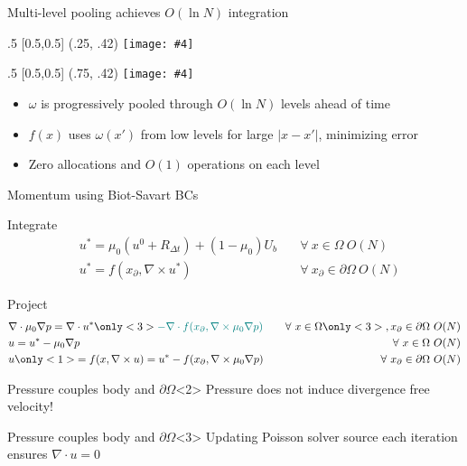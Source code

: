 \documentclass[aspectratio=169,small]{beamer}
\newcommand{\absimage}[4][0.5,0.5]{%
	\begin{textblock}{#3}%
		[#1]%
		(#2)%
		\texttt{[image: \#4]}%
\end{textblock}}
\begin{document}
\begin{frame}[fragile]{Multi-level pooling achieves $O(\ln N)$ integration} %
    \absimage{.25, .42}{.5}{fig/full_vort.png}
    \absimage{.75, .42}{.5}{fig/multilevel_vort.png}
    \vspace{52mm}
    \begin{itemize}
        \item $\omega$ is progressively pooled through $O(\ln N)$ levels ahead of time
        \item $f(x)$ uses $\omega(x')$ from low levels for large $|x-x'|$, minimizing error
        \item Zero allocations and $O(1)$ operations on each level 
    \end{itemize}
\end{frame}

\begin{frame}[fragile]{Momentum using Biot-Savart BCs} %
  \begin{block}{Integrate}
      \begin{align*}
        &u^* = \mu_0(u^0+R_{\Delta t})+(1-\mu_0)U_b &\quad\forall\ x\in\Omega\ O(N) \\
        &u^* = f(x_\partial,\nabla\times u^*) &\quad\forall\ x_\partial\in\partial\Omega\ O(N)
      \end{align*}
  \end{block}
  \begin{block}{Project}
      \begin{align*}
          &\nabla\cdot\mu_0\nabla p = \nabla\cdot u^*\only<3>{\color{teal}{-\nabla\cdot f(x_\partial,\nabla\times\mu_0\nabla p)}} &\quad\forall\ x\in\Omega\only<3>{, x_\partial\in\partial\Omega}\ O(N)\\
          &u = u^*-\mu_0\nabla p &\quad\forall\ x\in\Omega\ O(N)\\
          &u \only<1>{ = f(x,\nabla\times u)}= u^*-f(x_\partial,\nabla\times\mu_0\nabla p) &\quad\forall\ x_\partial\in\partial\Omega\ O(N)
      \end{align*}
  \end{block}
  \begin{alertblock}{Pressure couples body and $\partial\Omega$}<2>
    Pressure does not induce divergence free velocity!
  \end{alertblock}
  \vspace{-15mm}
  \begin{exampleblock}{Pressure couples body and $\partial\Omega$}<3>
    Updating Poisson solver source each iteration ensures $\nabla\cdot u = 0$
  \end{exampleblock}
\end{frame}
\end{document}
